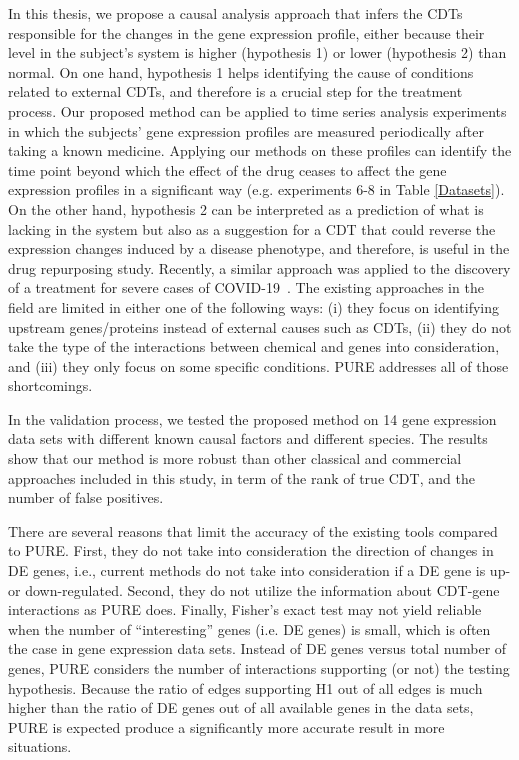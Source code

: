 In this thesis, we propose a causal analysis approach that infers the CDTs responsible for the changes in the gene expression profile, either because their level in the subject's system is higher (hypothesis 1) or lower (hypothesis 2) than normal. 
On one hand,  hypothesis 1 helps identifying the cause of conditions related to external CDTs, and therefore is a crucial step for the treatment process. 
Our proposed method can be applied to time series analysis experiments in which the subjects' gene expression profiles are measured periodically after taking a known medicine. Applying our methods on these profiles can identify the time point beyond which the effect of the drug ceases to affect the gene expression profiles in a significant way  (e.g. experiments 6-8 in Table \ref{Datasets}).
On the other hand, hypothesis 2 can be interpreted as a prediction of what is lacking in the system but also as a suggestion for a CDT that could reverse the expression changes induced by a disease phenotype, and therefore, is useful in the drug repurposing study. Recently, a similar approach was applied to the discovery of a treatment for severe cases of COVID-19~\cite{DraghiciCOVID:2021}. 
The existing approaches in the field are limited in either one of the following ways: 
(i) they focus  on identifying upstream genes/proteins instead of external causes such as CDTs, (ii) they do not take the type of the interactions between chemical and genes into consideration, and (iii) they only focus on some specific conditions. PURE addresses all of those shortcomings.



In the validation process, we tested the proposed method on 14 gene expression data sets with different known causal factors and different species. The results show that our method is more robust than other classical and commercial approaches included in this study, in term of the rank of true CDT, and the number of false positives.

There are several reasons that limit the accuracy of the existing tools compared to PURE. First, they do not take into consideration the direction of changes in DE genes, i.e., current methods do not take into consideration if a DE gene is up- or down-regulated. Second, they do not utilize the information about CDT-gene interactions as PURE does. Finally, Fisher's exact test may not yield reliable when the number of ``interesting'' genes (i.e. DE genes) is small, which is often the case in gene expression data sets. Instead of DE genes versus total number of  genes, PURE considers the number of interactions supporting (or not)  the testing hypothesis. Because the ratio of edges supporting H1 out of all edges is much higher than the ratio of DE genes out of all available genes in the data sets, PURE is expected produce a significantly more accurate result in more situations.


